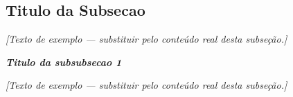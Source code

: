 \subsection{Titulo da Subsecao}\label{subsec:diagnostico}
\textit{[Texto de exemplo --- substituir pelo conteúdo real desta subseção.]}

\noindent\textbf{\textit{Titulo da subsubsecao 1}}

\textit{[Texto de exemplo --- substituir pelo conteúdo real desta subseção.]}
